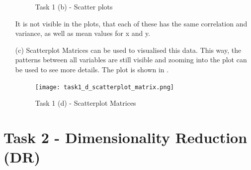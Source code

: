 \documentclass[a4paper]{article}
\begin{document}
\begin{enumerate}
\begin{figure}[!ht]
		
		
		\caption{Task 1 (b) - Scatter plots}
		\label{scatterplots}
	\end{figure}
	
	It is not visible in the plots, that each of these has the same correlation and variance, as well as mean values for x and y. 
	
	\item[(c)] Scatterplot Matrices can be used to visualised this data. 
	This way, the patterns between all variables are still visible and zooming into the plot can be used to see more details. 
	The plot is shown in .
	\begin{figure}[!ht]
		\texttt{[image: task1\_d\_scatterplot\_matrix.png]}
		
		\caption{Task 1 (d) - Scatterplot Matrices }
		\label{scatterplots_d}
	\end{figure}
	
\end{enumerate}

\newpage
\section*{Task 2 - Dimensionality Reduction (DR)}
\end{document}
